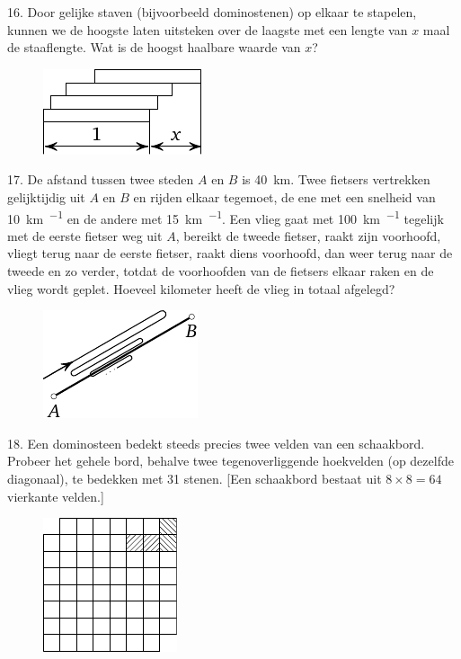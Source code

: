 \begin{problem}{16.}
	Door gelijke staven (bijvoorbeeld dominostenen) op elkaar te stapelen, kunnen we de hoogste laten uitsteken over de laagste met een lengte van $x$ maal de staaflengte. Wat is de hoogst haalbare waarde van $x$?
	\begin{figure}
		\includegraphics{resources/taskbook-97}
	\end{figure}
\end{problem}

\begin{problem}{17.}
	De afstand tussen twee steden $A$ en $B$ is \SI{40}{\km}. Twee fietsers vertrekken gelijktijdig uit $A$ en $B$ en rijden elkaar tegemoet, de ene met een snelheid van \SI{10}{\km\per\uur} en de andere met \SI{15}{\km\per\uur}. Een vlieg gaat met \SI{100}{\km\per\uur} tegelijk met de eerste fietser weg uit $A$, bereikt de tweede fietser, raakt zijn voorhoofd, vliegt terug naar de eerste fietser, raakt diens voorhoofd, dan weer terug naar de tweede en zo verder, totdat de voorhoofden van de fietsers elkaar raken en de vlieg wordt geplet. Hoeveel kilometer heeft de vlieg in totaal afgelegd?
	\begin{figure}
		\includegraphics{resources/taskbook-1}
	\end{figure}
\end{problem}

\clearpage

\begin{problem}{18.}
	Een dominosteen bedekt steeds precies twee velden van een schaakbord. Probeer het gehele bord, behalve twee tegenoverliggende hoekvelden (op dezelfde diagonaal), te bedekken met 31 stenen. [Een schaakbord bestaat uit $8 \times 8 = 64$ vierkante velden.]
	\begin{figure}
		\includegraphics{resources/taskbook-2}
	\end{figure}
\end{problem}


